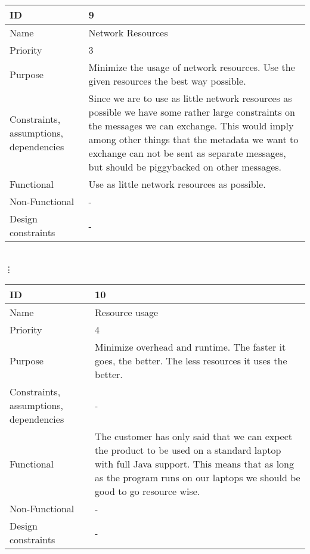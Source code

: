\begin{tabular}{| p{4cm} | p{8cm} |}
    \hline
    ID & 9 \\
    \hline
    Name & Network Resources \\
    \hline
    Priority & 3 \\
    \hline
    Purpose & Minimize the usage of network resources. Use the given resources the best way possible. \\
    \hline 
    Constraints, assumptions, dependencies & Since we are to use as little network resources as possible we have some rather large constraints on the messages we can exchange. This would imply among other things that the metadata we want to exchange can not be sent as separate messages, but should be piggybacked on other messages. \\
    \hline  
    Functional & Use as little network resources as possible.\\
    \hline
    Non-Functional & -\\ 
    \hline
    Design constraints & -\\
    \hline
\end{tabular}
\\  \vdots  \\

\begin{tabular}{| p{4cm} | p{8cm} |}
    \hline
    ID & 10 \\
    \hline
    Name & Resource usage  \\
    \hline
    Priority & 4 \\
    \hline
    Purpose & Minimize overhead and runtime. The faster it goes, the better. The less resources it uses the better. \\
    \hline 
    Constraints, assumptions, dependencies & -\\
    \hline  
    Functional & The customer has only said that we can expect the product to be used on a standard laptop with full Java support. This means that as long as the program runs on our laptops we should be good to go resource wise. \\
    \hline
    Non-Functional & -\\ 
    \hline
    Design constraints & -\\
    \hline
\end{tabular}
\\
